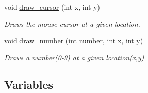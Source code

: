 \begin{DoxyCompactItemize}
void \hyperlink{group___bitmap_ga108608b0f2d804c84a271547036b6ffd}{draw\+\_\+cursor} (int x, int y)
\begin{DoxyCompactList}\small\item\em Draws the mouse cursor at a given location. \end{DoxyCompactList}\item 
void \hyperlink{group___bitmap_ga97df0f6e4184d84c9e3871042b94bc3a}{draw\+\_\+number} (int number, int x, int y)
\begin{DoxyCompactList}\small\item\em Draws a number(0-\/9) at a given location(x,y) \end{DoxyCompactList}\end{DoxyCompactItemize}
\subsection*{Variables}
